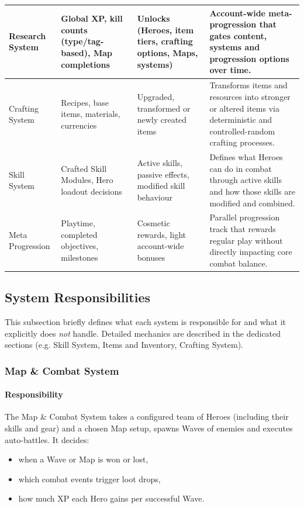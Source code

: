 \begin{tabular}{p{1.5cm}p{4.5cm}p{4.5cm}p{5cm}}
	Research System
	& Global XP, kill counts (type/tag-based), Map completions
	& Unlocks (Heroes, item tiers, crafting options, Maps, systems)
	& Account-wide meta-progression that gates content, systems and progression options over time. \\
	\hline
	
	Crafting System
	& Recipes, base items, materials, currencies
	& Upgraded, transformed or newly created items
	& Transforms items and resources into stronger or altered items via deterministic and controlled-random crafting processes. \\
	\hline
		
	Skill System
	& Crafted Skill Modules, Hero loadout decisions
	& Active skills, passive effects, modified skill behaviour
	& Defines what Heroes can do in combat through active skills and how those skills are modified and combined. \\
	\hline

	Meta Progression
	& Playtime, completed objectives, milestones
	& Cosmetic rewards, light account-wide bonuses
	& Parallel progression track that rewards regular play without directly impacting core combat balance. \\
\end{tabular}


\subsection{System Responsibilities}

This subsection briefly defines what each system is responsible for and what it explicitly does \emph{not} handle. 
Detailed mechanics are described in the dedicated sections (e.g. Skill System, Items and Inventory, Crafting System).

\subsubsection*{Map \& Combat System}

\paragraph{Responsibility}
The Map \& Combat System takes a configured team of Heroes (including their skills and gear) and a chosen Map setup,
spawns Waves of enemies and executes auto-battles. It decides:
\begin{itemize}
	\item when a Wave or Map is won or lost,
	\item which combat events trigger loot drops,
	\item how much XP each Hero gains per successful Wave.
\end{itemize}

